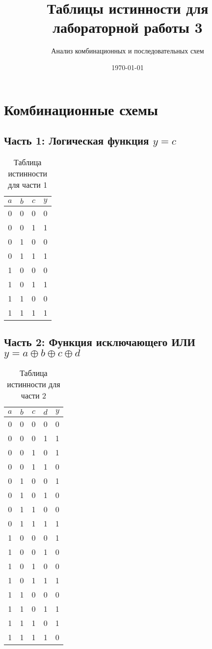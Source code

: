 \documentclass[12pt,a4paper]{article}
\title{Таблицы истинности для лабораторной работы 3}
\author{Анализ комбинационных и последовательных схем}
\date{\today}
\begin{document}
\maketitle

\section{Комбинационные схемы}

\subsection{Часть 1: Логическая функция $y = c$}

\begin{table}[h]
\centering
\caption{Таблица истинности для части 1}
\begin{tabular}{|c|c|c|c|}
\hline
$a$ & $b$ & $c$ & $y$ \\
\hline
0 & 0 & 0 & 0 \\
0 & 0 & 1 & 1 \\
0 & 1 & 0 & 0 \\
0 & 1 & 1 & 1 \\
1 & 0 & 0 & 0 \\
1 & 0 & 1 & 1 \\
1 & 1 & 0 & 0 \\
1 & 1 & 1 & 1 \\
\hline
\end{tabular}
\end{table}

\subsection{Часть 2: Функция исключающего ИЛИ $y = a \oplus b \oplus c \oplus d$}

\begin{table}[h]
\centering
\caption{Таблица истинности для части 2}
\begin{tabular}{|c|c|c|c|c|}
\hline
$a$ & $b$ & $c$ & $d$ & $y$ \\
\hline
0 & 0 & 0 & 0 & 0 \\
0 & 0 & 0 & 1 & 1 \\
0 & 0 & 1 & 0 & 1 \\
0 & 0 & 1 & 1 & 0 \\
0 & 1 & 0 & 0 & 1 \\
0 & 1 & 0 & 1 & 0 \\
0 & 1 & 1 & 0 & 0 \\
0 & 1 & 1 & 1 & 1 \\
1 & 0 & 0 & 0 & 1 \\
1 & 0 & 0 & 1 & 0 \\
1 & 0 & 1 & 0 & 0 \\
1 & 0 & 1 & 1 & 1 \\
1 & 1 & 0 & 0 & 0 \\
1 & 1 & 0 & 1 & 1 \\
1 & 1 & 1 & 0 & 1 \\
1 & 1 & 1 & 1 & 0 \\
\hline
\end{tabular}
\end{table}
\end{document}
